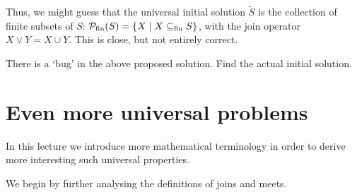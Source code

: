     Thus, we might guess that the universal initial solution $\widetilde{S}$ is
    the collection of finite subsets of $S$: $\mathcal{P}_{\mathrm{fin}}(S) =
    \{ X \mid
    X \subseteq_\mathrm{fin} S \}$, with the join operator $X \lor Y = X \cup Y$.
    This is close, but not entirely correct.
    
    \begin{exercise}
    There is a `bug' in the above proposed solution. Find the actual initial
    solution.\label{ex:bug}  
    \end{exercise}
    
    \chapter{Even more universal problems}
    
    In this lecture we introduce more mathematical terminology in order to 
    derive more interesting such universal properties.
    
    We begin by further analysing the definitions of joins and meets.
    
